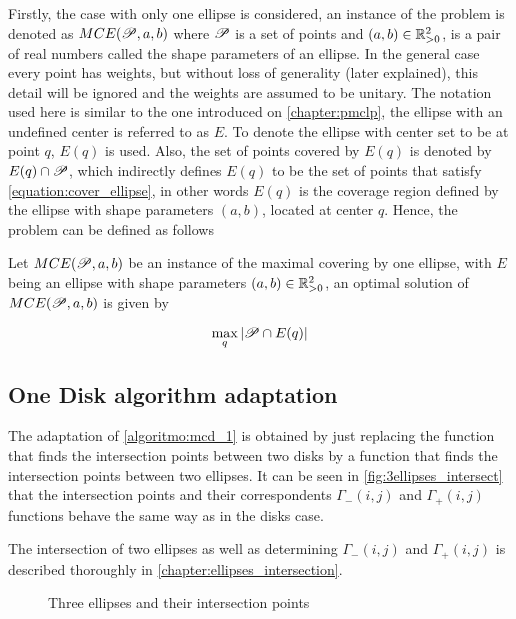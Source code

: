 Firstly, the case with only one ellipse is considered, an instance of the problem is denoted as $MCE(\mathscr{P}, a, b)$ where $\mathscr{P}$ is a set of points and $(a,b) \in \mathbb{R}_{>0}^2$, is a pair of real numbers called the shape parameters of an ellipse. 
In the general case every point has weights, but without loss of generality (later explained), this detail will be ignored and the weights are assumed to be unitary.
The notation used here is similar to the one introduced on \autoref{chapter:pmclp}, the ellipse with an undefined center is referred to as $E$. To denote the ellipse with center set to be at point $q$, $E(q)$ is used. Also, the set of points covered by $E(q)$ is denoted by $E(q) \cap \mathscr{P}$, which indirectly defines $E(q)$ to be the set of points that satisfy \autoref{equation:cover_ellipse}, in other words $E(q)$ is the coverage region defined by the ellipse with shape parameters $(a,b)$, located at center $q$. Hence, the problem can be defined as follows

\begin{definicao}
Let $MCE(\mathscr{P}, a, b)$ be an instance of the maximal covering by one ellipse, with $E$ being an ellipse with shape parameters $(a,b) \in \mathbb{R}_{>0}^2$, an optimal solution of $MCE(\mathscr{P}, a, b)$ is given by

\begin{equation}
    \max_q |\mathscr{P} \cap E(q)|
\end{equation}
\end{definicao}

\subsection{One Disk algorithm adaptation}

The adaptation of \autoref{algoritmo:mcd_1} is obtained by just replacing the function that finds the intersection points between two disks by a function that finds the intersection points between two ellipses.
It can be seen in \autoref{fig:3ellipses_intersect} that the intersection points and their correspondents $\Gamma_-(i,j)$ and $\Gamma_+(i,j)$ functions behave the same way as in the disks case.

The intersection of two ellipses as well as determining $\Gamma_-(i,j)$ and $\Gamma_+(i,j)$ is described thoroughly in \autoref{chapter:ellipses_intersection}. 


\begin{figure}[H]
\centering

    \caption{Three ellipses and their intersection points}
    
    \fautor
    \label{fig:3ellipses_intersect}
\end{figure}

